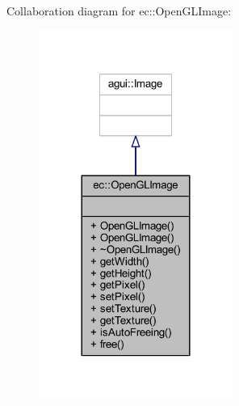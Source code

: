 Collaboration diagram for ec\+:\+:Open\+G\+L\+Image\+:\nopagebreak
\begin{figure}[H]
\begin{center}
\leavevmode
\includegraphics[width=180pt]{classec_1_1_open_g_l_image__coll__graph}
\end{center}
\end{figure}
